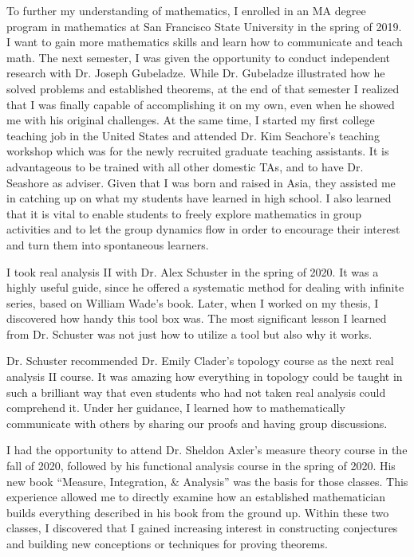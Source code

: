 \documentclass[10pt]{amsart}
\begin{document}
To further my understanding of mathematics, I enrolled in an MA degree program in mathematics at San Francisco State University in the spring of 2019. I want to gain more mathematics skills and learn how to communicate and teach math. The next semester, I was given the opportunity to conduct independent research with Dr. Joseph Gubeladze. While Dr. Gubeladze illustrated how he solved problems and established theorems, at the end of that semester I realized that I was finally capable of accomplishing it on my own, even when he showed me with his original challenges. At the same time, I started my first college teaching job in the United States and attended Dr. Kim Seachore's teaching workshop which was for the newly recruited graduate teaching assistants. It is advantageous to be trained with all other domestic TAs, and to have Dr. Seashore as adviser. Given that I was born and raised in Asia, they assisted me in catching up on what my students have learned in high school. I also learned that it is vital to enable students to freely explore mathematics in group activities and to let the group dynamics flow in order to encourage their interest and turn them into spontaneous learners.


I took real analysis II with Dr. Alex Schuster in the spring of 2020. It was a highly useful guide, since he offered a systematic method for dealing with infinite series, based on William Wade's book. Later, when I worked on my thesis, I discovered how handy this tool box was. The most significant lesson I learned from Dr. Schuster was not just how to utilize a tool but also why it works.

Dr. Schuster recommended Dr. Emily Clader's topology course as the next real analysis II course. It was amazing how everything in topology could be taught in such a brilliant way that even students who had not taken real analysis could comprehend it. Under her guidance, I learned how to mathematically communicate with others by sharing our proofs and having group discussions. 

I had the opportunity to attend Dr. Sheldon Axler's measure theory course in the fall of 2020,
followed by his functional analysis course in the spring of 2020. His new book ``Measure, Integration, $\&$ Analysis'' was the basis for those classes. This experience allowed me to directly examine how an established mathematician builds everything described in his book from the ground up. Within these two classes, I discovered that I gained increasing interest in constructing conjectures and building new conceptions or techniques for proving theorems.
\end{document}
